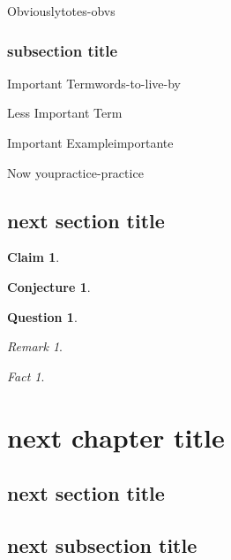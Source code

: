 \documentclass{book}
\newtheorem*{claim}{Claim}
\theoremstyle{definition}
\newtheorem*{conj}{Conjecture}
\newtheorem*{ques}{Question}
\theoremstyle{remark}
\newtheorem*{rmk}{Remark}
\newtheorem*{fact}{Fact}
\begin{document}
\begin{cor}{Obviously}{totes-obvs}
  \lipsum[6-6]
\end{cor}

\subsection{subsection title}

\lipsum[7-7]

\begin{defn}{Important Term}{words-to-live-by}
  \lipsum[8-8]
\end{defn}

\begin{defn*}{Less Important Term} %
  \lipsum[8-8]
\end{defn*}

\begin{ex}{Important Example}{importante}
  \lipsum[9-9]
  \tcblower
  \lipsum[10-10]
\end{ex}

\begin{exc}{Now you}{practice-practice}
  \lipsum[11-11]
\end{exc}

\section{next section title}

\lipsum[12-12]

\begin{claim}
  \lipsum[13-13]
\end{claim}

\begin{conj}
  \lipsum[14-14]
\end{conj}

\begin{ques}
  \lipsum[15-15]
\end{ques}

\begin{rmk}
  \lipsum[16-16]
\end{rmk}

\begin{fact}
  \lipsum[17-17]
\end{fact}

\chapter{next chapter title}

\lipsum[18-18]

\section{next section title}

\lipsum[19-19]

\section{next subsection title}

\lipsum[20-20]
\end{document}
